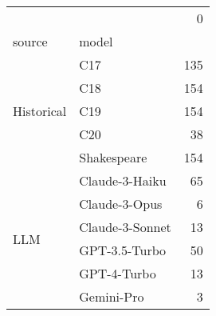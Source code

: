 \begin{tabular}{llr}
\toprule
 &  & 0 \\
source & model &  \\
\midrule
\multirow[t]{5}{*}{Historical} & C17 & 135 \\
 & C18 & 154 \\
 & C19 & 154 \\
 & C20 & 38 \\
 & Shakespeare & 154 \\
\cline{1-3}
\multirow[t]{6}{*}{LLM} & Claude-3-Haiku & 65 \\
 & Claude-3-Opus & 6 \\
 & Claude-3-Sonnet & 13 \\
 & GPT-3.5-Turbo & 50 \\
 & GPT-4-Turbo & 13 \\
 & Gemini-Pro & 3 \\
\cline{1-3}
\bottomrule
\end{tabular}
